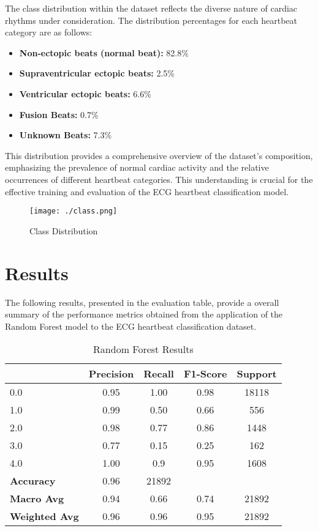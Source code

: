 \documentclass[conference]{IEEEtran}
\begin{document}
The class distribution within the dataset reflects the diverse nature of cardiac rhythms under consideration. The distribution percentages for each heartbeat category are as follows:

\begin{itemize}
    \item \textbf{Non-ectopic beats (normal beat):} 82.8\%
    \item \textbf{Supraventricular ectopic beats:} 2.5\%
    \item \textbf{Ventricular ectopic beats:} 6.6\%
    \item \textbf{Fusion Beats:} 0.7\%
    \item \textbf{Unknown Beats:} 7.3\%
\end{itemize}

This distribution provides a comprehensive overview of the dataset's composition, emphasizing the prevalence of normal cardiac activity and the relative occurrences of different heartbeat categories. This understanding is crucial for the effective training and evaluation of the ECG heartbeat classification model.

\begin{figure}[h]
    \centering
    \begin{minipage}{0.45\textwidth}
        \centering
        \texttt{[image: ./class.png]}
        \caption{Class Distribution}
        \label{fig:Class Distribution}
    \end{minipage}\hfill
\end{figure}


\section{Results}
The following results, presented in the evaluation table, provide a overall summary of the performance metrics obtained from the application of the Random Forest model to the ECG heartbeat classification dataset.

\begin{table}[H]
    \centering
    \begin{tabular}{lcccc}
        \toprule
        & Precision & Recall & F1-Score & Support \\
        \midrule
        0.0 & 0.95 & 1.00 & 0.98 & 18118 \\
        1.0 & 0.99 & 0.50 & 0.66 & 556 \\
        2.0 & 0.98 & 0.77 & 0.86 & 1448 \\
        3.0 & 0.77 & 0.15 & 0.25 & 162 \\
        4.0 & 1.00 & 0.9 & 0.95 & 1608 \\
        \midrule
        \textbf{Accuracy} & 0.96 & 21892 \\
        \textbf{Macro Avg} & 0.94 & 0.66 & 0.74 & 21892 \\
        \textbf{Weighted Avg} & 0.96 & 0.96 & 0.95 & 21892 \\
        \bottomrule
    \end{tabular}
    \caption{Random Forest Results}
    \label{tab:classification_results}
\end{table}
\end{document}
